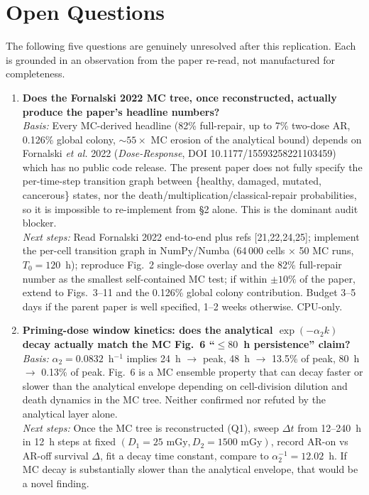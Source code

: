 \section{Open Questions}

The following five questions are genuinely unresolved after this replication. Each is
grounded in an observation from the paper re-read, not manufactured for completeness.

\begin{enumerate}

\item \textbf{Does the Fornalski 2022 MC tree, once reconstructed, actually produce the
paper's headline numbers?}\\
\emph{Basis:} Every MC-derived headline (82\% full-repair, up to 7\% two-dose AR,
0.126\% global colony, $\sim\!55\times$ MC erosion of the analytical bound) depends on
Fornalski \emph{et al.} 2022 (\emph{Dose-Response}, DOI 10.1177/15593258221103459)
which has no public code release. The present paper does not fully specify the
per-time-step transition graph between \{healthy, damaged, mutated, cancerous\}
states, nor the death/multiplication/classical-repair probabilities, so it is
impossible to re-implement from \S2 alone. This is the dominant audit blocker.\\
\emph{Next steps:} Read Fornalski 2022 end-to-end plus refs [21,22,24,25]; implement the
per-cell transition graph in NumPy/Numba (64\,000 cells $\times$ 50 MC runs, $T_0=120$~h);
reproduce Fig.~2 single-dose overlay and the 82\% full-repair number as the smallest
self-contained MC test; if within $\pm 10\%$ of the paper, extend to Figs.~3--11 and the
0.126\% global colony contribution. Budget 3--5 days if the parent paper is well
specified, 1--2 weeks otherwise. CPU-only.

\item \textbf{Priming-dose window kinetics: does the analytical
$\exp(-\alpha_2 k)$ decay actually match the MC Fig.~6 ``$\le 80$~h persistence'' claim?}\\
\emph{Basis:} $\alpha_2=0.0832$~h$^{-1}$ implies 24~h $\to$ peak, 48~h $\to$ 13.5\% of
peak, 80~h $\to$ 0.13\% of peak. Fig.~6 is a MC ensemble property that can decay
faster or slower than the analytical envelope depending on cell-division dilution and
death dynamics in the MC tree. Neither confirmed nor refuted by the analytical layer
alone.\\
\emph{Next steps:} Once the MC tree is reconstructed (Q1), sweep $\Delta t$ from 12--240~h
in 12~h steps at fixed $(D_1{=}25\text{~mGy}, D_2{=}1500\text{~mGy})$, record AR-on vs
AR-off survival $\Delta$, fit a decay time constant, compare to
$\alpha_2^{-1}=12.02$~h. If MC decay is substantially slower than the analytical
envelope, that would be a novel finding.


\end{enumerate}
